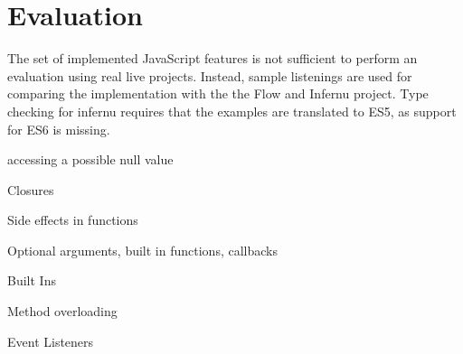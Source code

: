 \section{Evaluation}
The set of implemented JavaScript features is not sufficient to perform an evaluation using real live projects. Instead, sample listenings are used for comparing the implementation with the the Flow and Infernu project. Type checking for infernu requires that the examples are translated to ES5, as support for ES6 is missing.


accessing a possible null value

Closures

Side effects in functions

Optional arguments, built in functions, callbacks

Built Ins

Method overloading

Event Listeners
